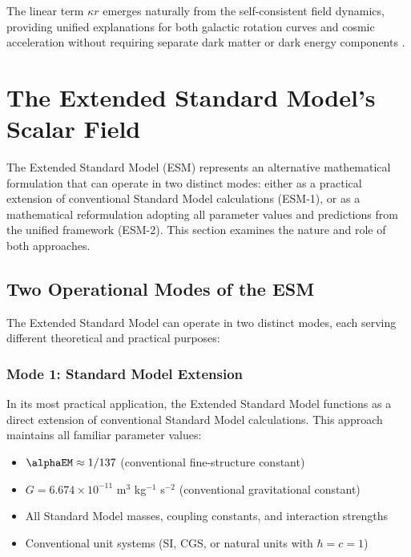 	The linear term $\kappa r$ emerges naturally from the self-consistent field dynamics, providing unified explanations for both galactic rotation curves and cosmic acceleration without requiring separate dark matter or dark energy components \cite{McGaugh2016}.
	
	\section{The Extended Standard Model's Scalar Field}
	\label{sec:esm_scalar_field}
	
	The Extended Standard Model (ESM) represents an alternative mathematical formulation that can operate in two distinct modes: either as a practical extension of conventional Standard Model calculations (ESM-1), or as a mathematical reformulation adopting all parameter values and predictions from the unified framework (ESM-2). This section examines the nature and role of both approaches.
	
	\subsection{Two Operational Modes of the ESM}
	\label{subsec:two_operational_modes}
	
	The Extended Standard Model can operate in two distinct modes, each serving different theoretical and practical purposes:
	
	\subsubsection{Mode 1: Standard Model Extension}
	\label{subsubsec:mode1_sm_extension}
	
	In its most practical application, the Extended Standard Model functions as a direct extension of conventional Standard Model calculations. This approach maintains all familiar parameter values:
	
	\begin{itemize}
		\item $\alphaEM \approx 1/137$ (conventional fine-structure constant) \cite{PDG2020}
		\item $G = 6.674 \times 10^{-11}$ m$^3$ kg$^{-1}$ s$^{-2}$ (conventional gravitational constant)
		\item All Standard Model masses, coupling constants, and interaction strengths
		\item Conventional unit systems (SI, CGS, or natural units with $\hbar = c = 1$)
	\end{itemize}
	
